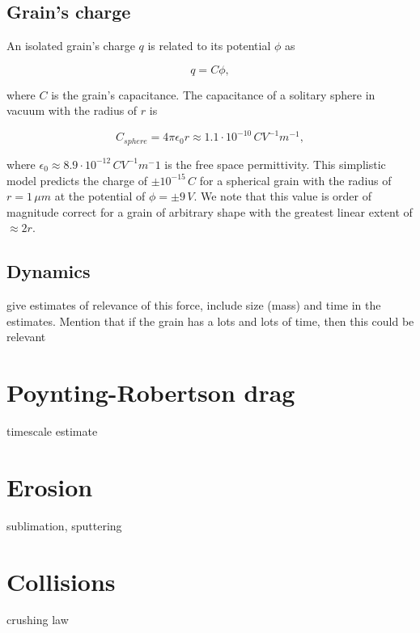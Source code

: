 \subsection{Grain's charge}

An isolated grain's charge $q$ is related to its potential $\phi$ as

\begin{equation}
    q = C \phi,
\end{equation}

where $C$ is the grain's capacitance. The capacitance of a solitary sphere in vacuum with the radius of $r$ is 

\begin{equation}
    C_{sphere} = 4 \pi \epsilon_0 r \approx 1.1 \cdot 10^{-10} \, \si{C V^{-1} m^{-1}},
\end{equation}

where $\epsilon_0 \approx 8.9\cdot10^{-12} \, \si{C V^{-1} m^-1}$ is the free space permittivity. This simplistic model predicts the charge of $\pm 10^{-15} \, \si{C}$ for a spherical grain with the radius of $r = 1 \, \si{\mu m}$ at the potential of $\phi = \pm 9 \, \si{V}$. We note that this value is order of magnitude correct for a grain of arbitrary shape with the greatest linear extent of $\approx 2r$.

\subsection{Dynamics}

give estimates of relevance of this force, include size (mass) and time in the estimates. Mention that if the grain has a lots and lots of time, then this could be relevant

\section{Poynting-Robertson drag}

timescale estimate 

\section{Erosion}

sublimation, sputtering

\section{Collisions}

crushing law